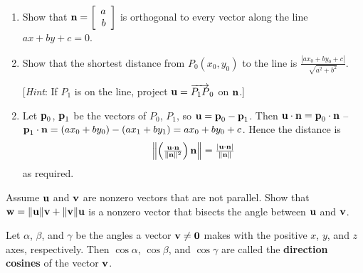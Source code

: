 \begin{multicols}{2}
\begin{ex}
\begin{sol}
\begin{enumerate}[label={\alph*.}]
\end{enumerate}
\end{sol}
\end{ex}

\begin{ex}
\begin{enumerate}[label={\alph*.}]
\item Show that $\textbf{n} = \left[
\begin{array}{r}
a\\
b
\end{array}
\right]$ is orthogonal to every vector along the line $ax + by + c = 0$.

\item Show that the shortest distance from $P_{0}(x_{0}, y_{0})$ to the line is $\frac{|ax_{0} + by_{0} + c|}{\sqrt{a^2 + b^2}}$.


[\textit{Hint}: If $P_{1}$ is on the line, project $\textbf{u} = \overrightarrow{P_{1}P}_{0}$ on $\textbf{n}$.]

\end{enumerate}
\begin{sol}
\begin{enumerate}[label={\alph*.}]
\setcounter{enumi}{1}
\item  Let $\textbf{p}_{0}$, $\textbf{p}_{1}$ be the vectors of $P_{0}$, $P_{1}$, so $\textbf{u} = \textbf{p}_{0} - \textbf{p}_{1}$. Then $\textbf{u} \cdot \textbf{n} = \textbf{p}_{0} \cdot \textbf{n}$ -- $\textbf{p}_{1} \cdot \textbf{n} = (ax_{0} + by_{0}) - (ax_{1} + by_{1}) = ax_{0} + by_{0} + c$. Hence the distance is 
\begin{equation*}
\left\| \left( \tfrac{\textbf{u} \cdot \textbf{n}}{\| \textbf{n} \|^2}\right)\textbf{n} \right\| = \tfrac{|\textbf{u} \cdot \textbf{n}|}{\| \textbf{n} \|}
\end{equation*}
 as required.

\end{enumerate}
\end{sol}
\end{ex}

\begin{ex}
Assume $\textbf{u}$ and $\textbf{v}$ are nonzero vectors that are not parallel. Show that $\textbf{w} = \|\textbf{u}\|\textbf{v} + \|\textbf{v}\|\textbf{u}$ is a nonzero vector that bisects the angle between $\textbf{u}$ and $\textbf{v}$.
\end{ex}

\begin{ex}
Let $\alpha$, $\beta$, and $\gamma$ be the angles a vector $\textbf{v} \neq \textbf{0}$ makes with the positive $x$, $y$, and $z$ axes, respectively. Then $\cos \alpha$, $\cos \beta$, and $\cos \gamma$ are called the \textbf{direction cosines} of the vector $\textbf{v}$.


\end{ex}
\end{multicols}
